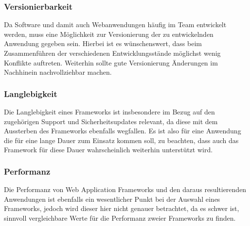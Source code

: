 \subsubsection*{Versionierbarkeit}
Da Software und damit auch Webanwendungen häufig im Team entwickelt werden, muss eine Möglichkeit zur Versionierung der zu entwickelnden Anwendung gegeben sein. Hierbei ist es wünschenswert, dass beim Zusammenführen der verschiedenen Entwicklungsstände möglichst wenig Konflikte auftreten. Weiterhin sollte gute Versionierung Änderungen im Nachhinein nachvollziehbar machen.
\subsubsection*{Langlebigkeit}
Die Langlebigkeit eines Frameworks ist insbesondere im Bezug auf den zugehörigen Support und Sicherheitsupdates relevant, da diese mit dem Aussterben des Frameworks ebenfalls wegfallen. Es ist also für eine Anwendung die für eine lange Dauer zum Einsatz kommen soll, zu beachten, dass auch das Framework für diese Dauer wahrscheinlich weiterhin unterstützt wird.\autocite[S.214]{EFCMW2013}
\subsubsection*{Performanz}
Die Performanz von Web Application Frameworks und den daraus resultierenden Anwendungen ist ebenfalls ein wesentlicher Punkt bei der Auswahl eines Frameworks, jedoch wird dieser hier nicht genauer betrachtet, da es schwer ist, sinnvoll vergleichbare Werte für die Performanz zweier Frameworks zu finden.

